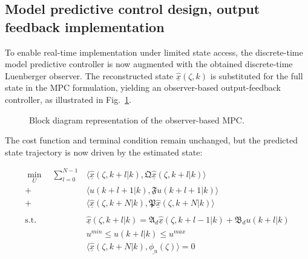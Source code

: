 \subsection{Model predictive control design, output feedback implementation}

To enable real-time implementation under limited state access, the discrete-time model predictive controller is now augmented with the obtained discrete-time Luenberger observer. The reconstructed state $\underline{\hat{x}}(\zeta,k)$ is substituted for the full state in the MPC formulation, yielding an observer-based output-feedback controller, as illustrated in Fig.~\ref{fig:block_diagram_obs}.

\begin{figure}[!htbp]
    \centering
    \caption{Block diagram representation of the observer-based MPC.}
    \label{fig:block_diagram_obs}
\end{figure}

The cost function and terminal condition remain unchanged, but the predicted state trajectory is now driven by the estimated state:

\begin{equation} \label{eq:MPC_finite_time_hat}
    \begin{aligned}
        \min_{U} \quad \sum_{l=0}^{N-1} &\langle \underline{\hat{x}}(\zeta, k+l | k), \mathfrak{Q} \underline{\hat{x}}(\zeta, k+l | k) \rangle \\
        + &\langle u(k+l+1 | k), \mathfrak{F} u(k+l+1|k) \rangle \\
        + &\langle \underline{\hat{x}}(\zeta, k+N | k), \mathfrak{P} \underline{\hat{x}}(\zeta, k+N | k) \rangle \\
        \, \\
        \text{s.t.} \quad &\underline{\hat{x}}(\zeta, k+l | k) = \mathfrak{A}_d \underline{\hat{x}}(\zeta, k+l-1 | k) + \mathfrak{B}_d u(k+l | k) \\
        &u^{min} \leq u(k+l | k) \leq u^{max} \\
        & \langle \underline{\hat{x}}(\zeta, k+N | k), \underline{\phi_u}(\zeta) \rangle = 0
    \end{aligned}
\end{equation}

